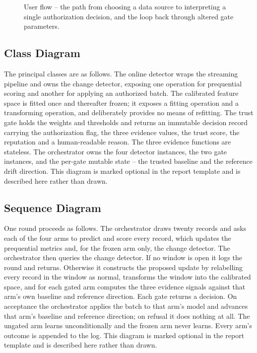 \documentclass[12pt,a4paper]{report}
\begin{document}
\begin{figure}[htbp]
\caption{User flow -- the path from choosing a data source to interpreting a
single authorization decision, and the loop back through altered gate
parameters.}
\label{fig:flow}
\end{figure}

\subsection{Class Diagram}

The principal classes are as follows. The online detector wraps the streaming
pipeline and owns the change detector, exposing one operation for prequential
scoring and another for applying an authorized batch. The calibrated feature
space is fitted once and thereafter frozen; it exposes a fitting operation and a
transforming operation, and deliberately provides no means of refitting. The
trust gate holds the weights and thresholds and returns an immutable decision
record carrying the authorization flag, the three evidence values, the trust
score, the reputation and a human-readable reason. The three evidence functions
are stateless. The orchestrator owns the four detector instances, the two gate
instances, and the per-gate mutable state -- the trusted baseline and the
reference drift direction. This diagram is marked optional in the report template
and is described here rather than drawn.

\subsection{Sequence Diagram}

One round proceeds as follows. The orchestrator draws twenty records and asks
each of the four arms to predict and score every record, which updates the
prequential metrics and, for the frozen arm only, the change detector. The
orchestrator then queries the change detector. If no window is open it logs the
round and returns. Otherwise it constructs the proposed update by relabelling
every record in the window as normal, transforms the window into the calibrated
space, and for each gated arm computes the three evidence signals against that
arm's own baseline and reference direction. Each gate returns a decision. On
acceptance the orchestrator applies the batch to that arm's model and advances
that arm's baseline and reference direction; on refusal it does nothing at all.
The ungated arm learns unconditionally and the frozen arm never learns. Every
arm's outcome is appended to the log. This diagram is marked optional in the
report template and is described here rather than drawn.
\end{document}
